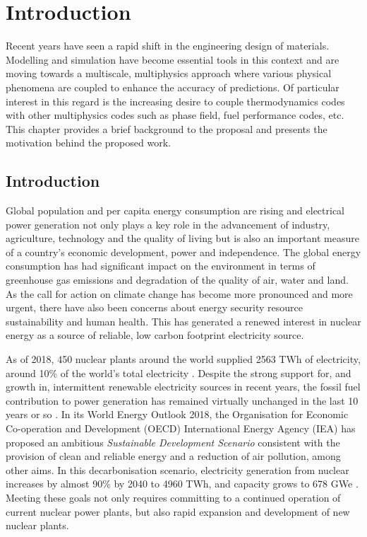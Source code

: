 \chapter{Introduction} \label{chapter_1}

Recent years have seen a rapid shift in the engineering design of materials. Modelling and simulation have become essential tools in this context and are moving towards a multiscale, multiphysics approach where various physical phenomena  are coupled to enhance the accuracy of predictions. Of particular interest in this regard is the increasing desire to couple thermodynamics codes with other multiphysics codes such as phase field, fuel performance codes, etc. This chapter provides a brief background to the proposal and presents the motivation behind the proposed work.

\section{Introduction}
	Global population and per capita energy consumption are rising and electrical power generation not only plays a key role in the advancement of industry, agriculture, technology and the quality of living but is also an important measure of a country's economic development, power and independence. The global energy consumption has had significant impact on the environment in terms of greenhouse gas emissions and degradation of the quality of air, water and land.  As the call for action on climate change has become more pronounced and more urgent, there have also been concerns about energy security resource sustainability and human health. This has generated a renewed interest in nuclear energy as a source of reliable, low carbon footprint electricity source. 

	As of 2018, 450 nuclear plants around the world supplied 2563 TWh of electricity, around 10\% of the world's total electricity \cite{WNA:2019aa}. Despite the strong support for, and growth in, intermittent renewable electricity sources in recent years, the fossil fuel contribution to power generation has remained virtually unchanged in the last 10 years or so \cite{WNA:2019aa}. In its World Energy Outlook 2018, the Organisation for Economic Co-operation and Development (OECD) International Energy Agency (IEA)  has proposed an ambitious \emph{Sustainable Development Scenario} consistent with the provision of clean and reliable energy and a reduction of air pollution, among other aims. In this decarbonisation scenario, electricity generation from nuclear increases by almost 90\% by 2040 to 4960 TWh, and capacity grows to 678 GWe \cite{IEA:2018aa}. Meeting these goals not only requires committing to a continued operation of current nuclear power plants, but also rapid expansion and development of new nuclear plants. 
	

